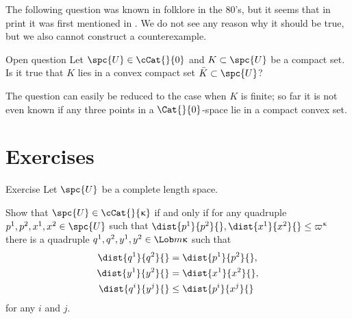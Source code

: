 





The following question was known in folklore in the 80's,
but it seems that in print
it was first mentioned in \cite{kopecka-reich}. %
We do not see any reason why it should be true, 
but we also cannot construct a counterexample.

\begin{thm}{Open question}
Let $\spc{U}\in\cCat{}{0}$ and $K\subset \spc{U}$ be a compact set.
Is it true that $K$ lies in a convex compact set $\bar K\subset\spc{U}$?
\end{thm}

The question can  easily be reduced to the case when $K$ is finite;
so far it is not even known if any three points in a $\Cat{}{0}$-space lie in a compact convex set.

\section{Exercises}

\begin{thm}{Exercise}
Let $\spc{U}$ be a complete length space.

Show that $\spc{U}\in\cCat{}{\kappa}$
if and only if for any quadruple $p^1,p^2,x^1,x^2\in \spc{U}$ such that
$\dist{p^1}{p^2}{},\dist{x^1}{x^2}{}\le \varpi\kappa$
there is a quadruple $q^1,q^2,y^1,y^2\in\Lob m\kappa$
such that 
\begin{align*}
\dist{q^1}{q^2}{}&=\dist{p^1}{p^2}{},
\\
\dist{y^1}{y^2}{}&=\dist{x^1}{x^2}{},
\\
\dist{q^i}{y^j}{}&\le \dist{p^i}{x^j}{}
\end{align*}
for any $i$ and $j$.
\end{thm}


